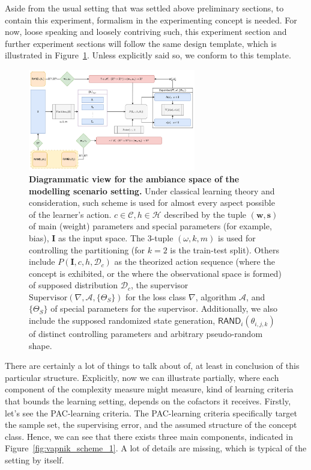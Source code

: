 \documentclass[10pt]{article} %
\begin{document}
Aside from the usual setting that was settled above preliminary sections, to contain this experiment, formalism in the experimenting concept is needed. For now, loose speaking and loosely contriving such, this experiment section and further experiment sections will follow the same design template, which is illustrated in Figure~\ref{fig:vapnik_scheme}. Unless explicitly said so, we conform to this template. 
\begin{figure}[htb]
  \centering
  \includegraphics[width=0.65\textwidth]{media/Diagramatic_Modelling_View.png}
  \caption{\textbf{Diagrammatic view for the ambiance space of the modelling scenario setting.} Under classical learning theory and consideration, such scheme is used for almost every aspect possible of the learner's action. $c\in\mathcal{C}, h\in \mathcal{H}$ described by the tuple $(\mathbf{w},\mathbf{s})$ of main (weight) parameters and special parameters (for example, bias), $\mathbf{I}$ as the input space. The 3-tuple $(\omega, k,m)$ is used for controlling the partitioning (for $k=2$ is the train-test split). Others include $P(\mathbf{I},c,h,\mathcal{D}_{c})$ as the theorized action sequence (where the concept is exhibited, or the where the observational space is formed) of supposed distribution $\mathcal{D}_{c}$, the supervisor $\text{Supervisor}(\nabla, \mathcal{A}, \{\Theta_{S}\})$ for the loss class $\nabla$, algorithm $\mathcal{A}$, and $\{\Theta_{S}\}$ of special parameters for the supervisor. Additionally, we also include the supposed randomized state generation, $\mathsf{RAND}_{i}(\theta_{i,j,k})$ of distinct controlling parameters and arbitrary pseudo-random shape.}
  \label{fig:vapnik_scheme}
\end{figure}

There are certainly a lot of things to talk about of, at least in conclusion of this particular structure. Explicitly, now we can illustrate partially, where each component of the complexity measure might measure, kind of learning criteria that bounds the learning setting, depends on the cofactors it receives. Firstly, let's see the PAC-learning criteria. The PAC-learning criteria specifically target the sample set, the supervising error, and the assumed structure of the concept class. Hence, we can see that there exists three main components, indicated in Figure~\ref{fig:vapnik_scheme_1}. A lot of details are missing, which is typical of the setting by itself. 
\end{document}
